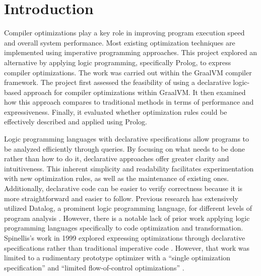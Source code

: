 \chapter[Introduction]{Introduction}

Compiler optimizations play a key role in improving program execution speed and overall system performance. Most existing optimization techniques are implemented using imperative programming approaches. This project explored an alternative by applying logic programming, specifically Prolog, to express compiler optimizations. The work was carried out within the GraalVM compiler framework. The project first assessed the feasibility of using a declarative logic-based approach for compiler optimizations within GraalVM. It then examined how this approach compares to traditional methods in terms of performance and expressiveness. Finally, it evaluated whether optimization rules could be effectively described and applied using Prolog.

Logic programming languages with declarative specifications allow programs to be analyzed efficiently through queries. By focusing on what needs to be done rather than how to do it, declarative approaches offer greater clarity and intuitiveness. This inherent simplicity and readability facilitates experimentation with new optimization rules, as well as the maintenance of existing ones. Additionally, declarative code can be easier to verify correctness because it is more straightforward and easier to follow. Previous research has extensively utilized Datalog, a prominent logic programming language, for different levels of program analysis \cite{Bravenboer2009,Tonder2021,Lam2005,Benton2007}. However, there is a notable lack of prior work applying logic programming languages specifically to code optimization and transformation. Spinellis’s work in 1999 explored expressing optimizations through declarative specifications rather than traditional imperative code \cite{Spinellis1999}. However, that work was limited to a rudimentary prototype optimizer with a ``single optimization specification'' and ``limited flow-of-control optimizations'' \cite{Spinellis1999}.

